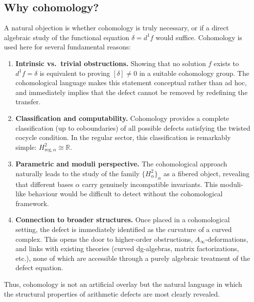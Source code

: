 \documentclass[11pt,a4paper]{article}
\theoremstyle{plain}
\theoremstyle{definition}
\theoremstyle{remark}
\newcommand{\RR}{\mathbb{R}}
\begin{document}
	\subsection{Why cohomology?}
	A natural objection is whether cohomology is truly necessary, or if a direct algebraic study of the functional equation $\delta = d^1 f$ would suffice. Cohomology is used here for several fundamental reasons:
	\begin{enumerate}
		\item \textbf{Intrinsic vs.\ trivial obstructions.} Showing that no solution $f$ exists to $d^1 f = \delta$ is equivalent to proving $[\delta] \neq 0$ in a suitable cohomology group. The cohomological language makes this statement conceptual rather than ad hoc, and immediately implies that the defect cannot be removed by redefining the transfer.
		\item \textbf{Classification and computability.} Cohomology provides a complete classification (up to coboundaries) of all possible defects satisfying the twisted cocycle condition. In the regular sector, this classification is remarkably simple: $H^2_{\mathrm{reg},\alpha}\cong\RR$.
		\item \textbf{Parametric and moduli perspective.} The cohomological approach naturally leads to the study of the family $\{H^2_\alpha\}_\alpha$ as a fibered object, revealing that different bases $\alpha$ carry genuinely incompatible invariants. This moduli-like behaviour would be difficult to detect without the cohomological framework.
		\item \textbf{Connection to broader structures.} Once placed in a cohomological setting, the defect is immediately identified as the curvature of a curved complex. This opens the door to higher-order obstructions, $A_\infty$-deformations, and links with existing theories (curved dg-algebras, matrix factorizations, etc.), none of which are accessible through a purely algebraic treatment of the defect equation.
	\end{enumerate}
	Thus, cohomology is not an artificial overlay but the natural language in which the structural properties of arithmetic defects are most clearly revealed.
	
\end{document}
